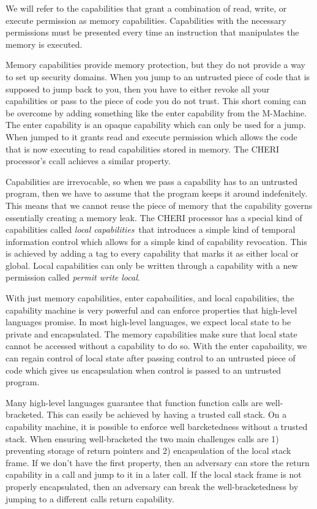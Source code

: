 \documentclass[compsoc,conference,letterpaper,fleqn]{IEEEtran}
\begin{document}
 We will refer to the capabilities
that grant a combination of read, write, or execute permission as memory
capabilities. 
 Capabilities with the necessary permissions must be
presented every time an instruction that manipulates the memory is
executed.

Memory capabilities provide memory protection, but they do not provide
a way to set up security domains. When you jump to an untrusted piece
of code that is supposed to jump back to you, then you have to either
revoke all your capabilities or pass to the piece of code you do not
trust. This short coming can be overcome by adding something like the
enter capability from the M-Machine. The enter
capability is an opaque capability which can only be used for a
jump. When jumped to it grants read and execute permission which
allows the code that is now executing to read capabilities stored in
memory. 
The CHERI processor's ccall achieves a similar property.

Capabilities are irrevocable, so when we pass a capability has to
an untrusted program, then we have to assume that the program keeps it
around indefenitely. This means that we cannot reuse the piece of
memory that the capability governs essentially creating a memory
leak. The CHERI processor has a special kind of capabilities called
\emph{local capabilities}\ that introduces a simple
kind of temporal information control which allows for a simple kind of
capability revocation. This is achieved by adding a tag to every
capability that marks it as either local or global. Local capabilities
can only be written through a capability with a new permission called
\emph{permit write local}.

With just memory capabilities, enter capabailities, and local
capabilities, the capability machine is very powerful and can
enforce properties that high-level languages promise. In most
high-level languages, we expect local state to be private and
encapsulated. The memory capabilities make sure that local state
cannot be accessed without a capability to do so. With the enter
capabaility, we can regain control of local state after passing
control to an untrusted piece of code which gives us encapsulation
when control is passed to an untrusted program.

Many high-level languages guarantee that function function calls are
well-bracketed. This can easily be achieved by having a trusted call
stack. On a capability machine, it is possible to enforce well
barcketedness without a trusted stack. When ensuring well-bracketed
the two main challenges calls are 1) preventing storage of return
pointers and 2) encapsulation of the local stack frame. If we don't
have the first property, then an adversary can store the return
capability in a call and jump to it in a later call. If the local
stack frame is not properly encapsulated, then an adversary can break
the well-bracketedness by jumping to a different calls return
capability.
\end{document}
